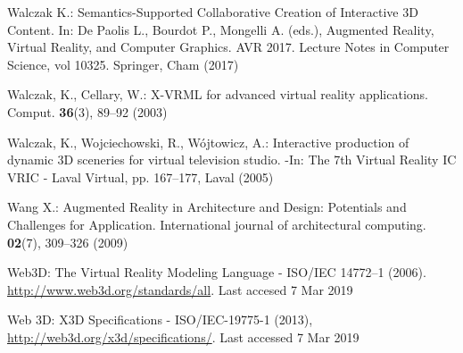 \documentclass[runningheads]{llncs}
\begin{document}
\begin{thebibliography}{8}
Walczak K.: Semantics-Supported Collaborative Creation of Interactive 3D Content. In: De Paolis L., Bourdot
P., Mongelli A. (eds.), Augmented Reality, Virtual Reality, and Computer Graphics. AVR 2017. Lecture Notes in
Computer Science, vol 10325. Springer, Cham (2017)

Walczak, K., Cellary, W.: X-VRML for advanced virtual reality applications. Comput.
 \textbf{36}(3), 89--92 (2003)

Walczak, K., Wojciechowski, R., W\'{o}jtowicz, A.: Interactive production of dynamic
3D sceneries for virtual television studio. -In: The 7th Virtual Reality IC VRIC -
Laval Virtual, pp. 167--177, Laval (2005)

Wang X.: Augmented Reality in Architecture and Design: Potentials and Challenges for Application.
International journal of architectural computing. \textbf{02}(7), 309--326 (2009)

Web3D: The Virtual Reality Modeling Language - ISO/IEC 14772–1 (2006).
\url{http://www.web3d.org/standards/all}. Last accesed 7 Mar 2019

Web 3D: X3D Specifications - ISO/IEC-19775-1 (2013), 
\url{http://web3d.org/x3d/specifications/}. Last accessed 7 Mar 2019

\end{thebibliography}
\end{document}
